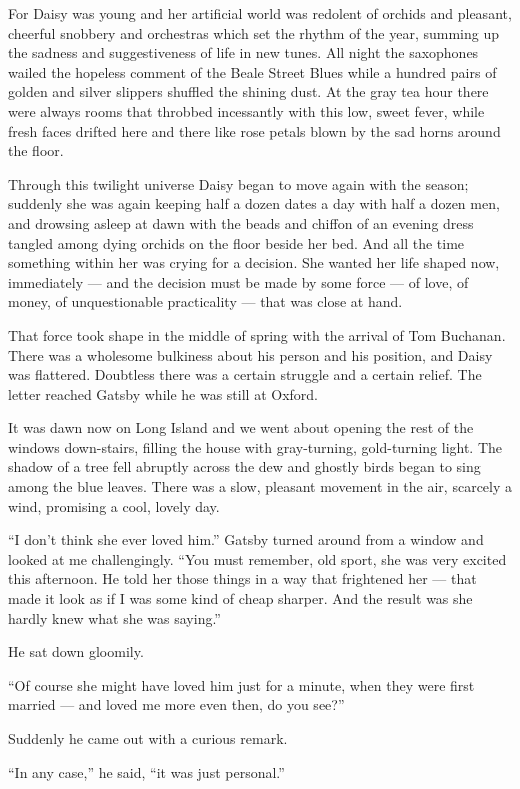 \documentclass{znotebook}
\begin{document}
For Daisy was young and her artificial world was redolent of orchids and pleasant, cheerful snobbery and orchestras which set the rhythm of the year, summing up the sadness and suggestiveness of life in new tunes. All night the saxophones wailed the hopeless comment of the Beale Street Blues while a hundred pairs of golden and silver slippers shuffled the shining dust. At the gray tea hour there were always rooms that throbbed incessantly with this low, sweet fever, while fresh faces drifted here and there like rose petals blown by the sad horns around the floor.

Through this twilight universe Daisy began to move again with the season; suddenly she was again keeping half a dozen dates a day with half a dozen men, and drowsing asleep at dawn with the beads and chiffon of an evening dress tangled among dying orchids on the floor beside her bed. And all the time something within her was crying for a decision. She wanted her life shaped now, immediately — and the decision must be made by some force — of love, of money, of unquestionable practicality — that was close at hand.

That force took shape in the middle of spring with the arrival of Tom Buchanan. There was a wholesome bulkiness about his person and his position, and Daisy was flattered. Doubtless there was a certain struggle and a certain relief. The letter reached Gatsby while he was still at Oxford.

It was dawn now on Long Island and we went about opening the rest of the windows down-stairs, filling the house with gray-turning, gold-turning light. The shadow of a tree fell abruptly across the dew and ghostly birds began to sing among the blue leaves. There was a slow, pleasant movement in the air, scarcely a wind, promising a cool, lovely day.

``I don't think she ever loved him.'' Gatsby turned around from a window and looked at me challengingly. ``You must remember, old sport, she was very excited this afternoon. He told her those things in a way that frightened her — that made it look as if I was some kind of cheap sharper. And the result was she hardly knew what she was saying.''

He sat down gloomily.

``Of course she might have loved him just for a minute, when they were first married — and loved me more even then, do you see?''

Suddenly he came out with a curious remark.

``In any case,'' he said, ``it was just personal.''
\end{document}
